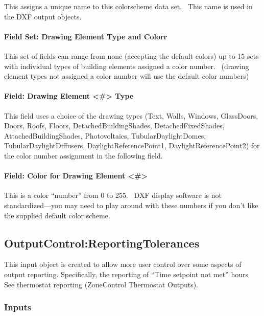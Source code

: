 This assigns a unique name to this colorscheme data set.~ This name is used in the DXF output objects.

\paragraph{Field Set: Drawing Element Type and Colorr}\label{field-set-drawing-element-type-and-colorr}

This set of fields can range from none (accepting the default colors) up to 15 sets with individual types of building elements assigned a color number.~ (drawing element types not assigned a color number will use the default color numbers)

\paragraph{Field: Drawing Element \textless{}\#\textgreater{} Type}\label{field-drawing-element-type}

This field uses a choice of the drawing types (Text, Walls, Windows, GlassDoors, Doors, Roofs, Floors, DetachedBuildingShades, DetachedFixedShades, AttachedBuildingShades, Photovoltaics, TubularDaylightDomes, TubularDaylightDiffusers, DaylightReferencePoint1, DaylightReferencePoint2) for the color number assignment in the following field.

\paragraph{Field: Color for Drawing Element \textless{}\#\textgreater{}}\label{field-color-for-drawing-element}

This is a color ``number'' from 0 to 255.~ DXF display software is not standardized---you may need to play around with these numbers if you don't like the supplied default color scheme.

\subsection{OutputControl:ReportingTolerances}\label{outputcontrolreportingtolerances}

This input object is created to allow more user control over some aspects of output reporting. Specifically, the reporting of ``Time setpoint not met'' hours~ See thermostat reporting (ZoneControl Thermostat Outputs).

\subsubsection{Inputs}\label{inputs-7-021}

